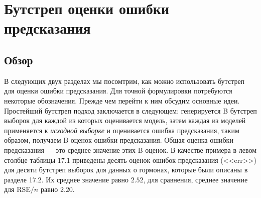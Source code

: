 \section{Бутстреп оценки ошибки предсказания}
\subsection{Обзор}
В следующих двух разделах мы посомтрим, как можно использовать бутстреп для оценки ошибки предсказания. Для точной формулировки потребуются некоторые обозначения. Прежде чем перейти к ним обсудим основные идеи. Простейший бутстреп подход заключается в следующем: генерируется B бутстреп выборок для каждой из которых оценивается модель, затем каждая из моделей применяется к \textit{исходной выборке} и оценивается ошибка предсказания, таким образом, получаем B оценок ошибки предсказания. Общая оценка ошибки предсказания --- это среднее значение этих B оценок. В качестве примера в левом столбце таблицы 17.1 приведены десять оценок ошибок предсказания (<<err>>) для десяти бутстреп выборок для данных о гормонах, которые были описаны в разделе 17.2. Их среднее значение равно $2.52$, для сравнения, среднее значение для $\text{RSE} / n$ равно $2.20$.
\begin{figure}[H]
\end{figure}

